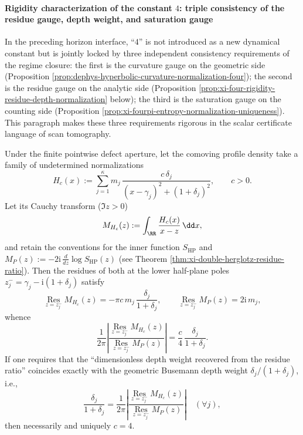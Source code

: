 \paragraph{Rigidity characterization of the constant \texorpdfstring{$4$}{4}: triple consistency of the residue gauge, depth weight, and saturation gauge}
In the preceding horizon interface, ``\(4\)'' is not introduced as a new dynamical constant but is jointly locked by three independent consistency requirements of the regime closure:
the first is the curvature gauge on the geometric side (Proposition \ref{prop:dephys-hyperbolic-curvature-normalization-four});
the second is the residue gauge on the analytic side (Proposition \ref{prop:xi-four-rigidity-residue-depth-normalization} below);
the third is the saturation gauge on the counting side (Proposition \ref{prop:xi-fourpi-entropy-normalization-uniqueness}).
This paragraph makes these three requirements rigorous in the scalar certificate language of scan tomography.

\begin{proposition}\label{prop:xi-four-rigidity-residue-depth-normalization}
Under the finite pointwise defect aperture, let the comoving profile density take a family of undetermined normalizations
\[
H_c(x)
:=\sum_{j=1}^{\kappa} m_j\,\frac{c\,\delta_j}{(x-\gamma_j)^2+(1+\delta_j)^2},
\qquad c>0.
\]
Let its Cauchy transform (\(\Im z>0\))
\[
M_{H_c}(z):=\int_{\RR}\frac{H_c(x)}{x-z}\,\dd x,
\]
and retain the conventions for the inner function \(S_{\mathrm{HP}}\) and
\(
M_P(z):=-2\mathrm{i}\,\frac{d}{dz}\log S_{\mathrm{HP}}(z)
\)
(see Theorem \ref{thm:xi-double-herglotz-residue-ratio}).
Then the residues of both at the lower half-plane poles \(z_j^-=\gamma_j-\mathrm{i}(1+\delta_j)\) satisfy
\[
\operatorname*{Res}_{z=z_j^-} M_{H_c}(z)=-\pi c\,m_j\,\frac{\delta_j}{1+\delta_j},
\qquad
\operatorname*{Res}_{z=z_j^-} M_{P}(z)=2\mathrm{i}\,m_j,
\]
whence
\[
\frac{1}{2\pi}\left|\frac{\operatorname*{Res}_{z=z_j^-} M_{H_c}(z)}{\operatorname*{Res}_{z=z_j^-} M_P(z)}\right|
=\frac{c}{4}\,\frac{\delta_j}{1+\delta_j}.
\]
If one requires that the ``dimensionless depth weight recovered from the residue ratio'' coincides exactly with the geometric Busemann depth weight \(\delta_j/(1+\delta_j)\), i.e.,
\[
\frac{\delta_j}{1+\delta_j}
=\frac{1}{2\pi}\left|\frac{\operatorname*{Res}_{z=z_j^-} M_{H_c}(z)}{\operatorname*{Res}_{z=z_j^-} M_P(z)}\right|
\quad(\forall j),
\]
then necessarily and uniquely \(c=4\).
\end{proposition}

